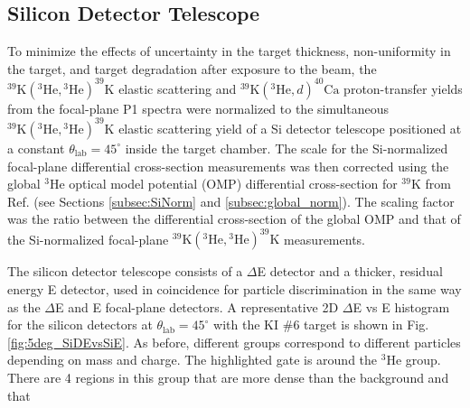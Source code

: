 \subsection{Silicon Detector Telescope} \label{subsec:SiDet}

To minimize the effects of uncertainty in the target thickness, non-uniformity in the target, and target degradation after exposure to the beam, the $^{39}\mathrm{K}(^{3}\mathrm{He}, {}^{3}\mathrm{He})^{39}\mathrm{K}$ elastic scattering and $^{39}\mathrm{K}(^{3}\mathrm{He}, d)^{40}\mathrm{Ca}$ proton-transfer yields from the focal-plane P1 spectra were normalized to the simultaneous $^{39}\mathrm{K}(^{3}\mathrm{He}, {}^{3}\mathrm{He})^{39}\mathrm{K}$ elastic scattering yield of a Si detector telescope positioned at a constant $\theta_{\mathrm{lab}} = 45^{\circ}$ inside the target chamber. The scale for the Si-normalized focal-plane differential cross-section measurements was then corrected using the global $^{3}\mathrm{He}$ optical model potential (OMP) differential cross-section for $^{39}\mathrm{K}$ from Ref. \cite{Liang2009} (see Sections \ref{subsec:SiNorm} and \ref{subsec:global_norm}). The scaling factor was the ratio between the differential cross-section of the global OMP and that of the Si-normalized focal-plane $^{39}\mathrm{K}(^{3}\mathrm{He}, {}^{3}\mathrm{He})^{39}\mathrm{K}$ measurements.

The silicon detector telescope consists of a $\Delta$E detector and a thicker, residual energy E detector, used in coincidence for particle discrimination in the same way as the $\Delta$E and E focal-plane detectors. A representative 2D $\Delta$E vs E histogram for the silicon detectors at $\theta_{\mathrm{lab}} = 45^{\circ}$ with the KI $\#$6 target is shown in Fig. \ref{fig:5deg_SiDEvsSiE}. As before, different groups correspond to different particles depending on mass and charge. The highlighted gate is around the $^{3}$He group. There are 4 regions in this group that are more dense than the background and that 


\def\yTS{1.175} %
\def\xTS{2.165} %
\def\sl{0.28} %
\def\su{0.4} %

